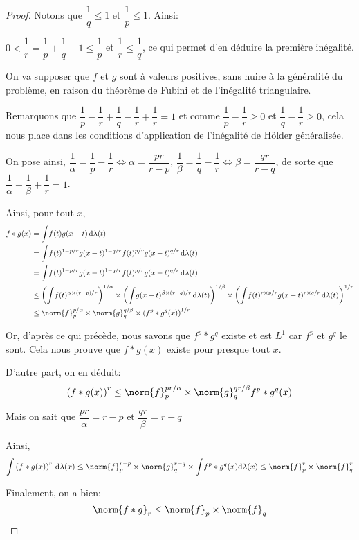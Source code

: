 \begin{proof}
Notons que $\dfrac{1}{q} \leq 1$ et $\dfrac{1}{p} \leq 1$. Ainsi:

$0 < \dfrac{1}{r} = \dfrac{1}{p}+\dfrac{1}{q}-1 \leq \dfrac{1}{p}$ et $\dfrac{1}{r} \leq \dfrac{1}{q}$, ce qui permet d'en déduire la première inégalité.

On va supposer que $f$ et $g$ sont à valeurs positives, sans nuire à la généralité du problème, en raison du théorème de Fubini et de l'inégalité triangulaire.

Remarquons que $\dfrac{1}{p}-\dfrac{1}{r}+\dfrac{1}{q}-\dfrac{1}{r}+\dfrac{1}{r} = 1$ et comme $\dfrac{1}{p}-\dfrac{1}{r} \geq 0$ et $\dfrac{1}{q}-\dfrac{1}{r} \geq 0$, cela nous place dans les conditions d'application de l'inégalité de Hölder généralisée.

On pose ainsi, $\dfrac{1}{\alpha} = \dfrac{1}{p}-\dfrac{1}{r} \iff \alpha = \dfrac{pr}{r-p}$, $\dfrac{1}{\beta} = \dfrac{1}{q}-\dfrac{1}{r} \iff \beta = \dfrac{qr}{r-q}$, de sorte que $\dfrac{1}{\alpha}+\dfrac{1}{\beta}+\dfrac{1}{r}=1$.

Ainsi, pour tout $x$,
\begin{align*}
f*g(x) & =\displaystyle{\int} f(t)g(x-t) \, \mathrm d \lambda(t) \\
 & = \displaystyle{\int} f(t)^{1-p/r}g(x-t)^{1-q/r}f(t)^{p/r}g(x-t)^{q/r} \, \mathrm d \lambda(t) \\
 & = \displaystyle{\int} f(t)^{1-p/r}g(x-t)^{1-q/r}f(t)^{p/r}g(x-t)^{q/r} \, \mathrm d \lambda(t) \\
 & \leq \left(\displaystyle{\int} f(t)^{\alpha \times (r-p)/r}\right)^{1/\alpha} \times \left(\displaystyle{\int} g(x-t)^{\beta\times (r-q)/r} \, \mathrm d \lambda(t)\right)^{1/\beta} \times \left(\displaystyle{\int} f(t)^{r \times p/r} g(x-t)^{r \times q/r} \, \mathrm d \lambda(t)\right)^{1/r} \\
  & \leq \norm{f}_p^{p/\alpha} \times \norm{g}_q^{q/\beta} \times   \left(f^p*g^q(x)\right)^{1/r}
 \end{align*}
 
Or, d'après ce qui précède, nous savons que $f^p*g^q$ existe et est $L^1$ car $f^p$ et $g^q$ le sont. Cela nous prouve que $f*g(x)$ existe pour presque tout $x$.

D'autre part, on en déduit:
\[
\left(f*g(x)\right)^r \leq \norm{f}_p^{pr/\alpha} \times \norm{g}_q^{qr/\beta} f^p*g^q(x)
\] 

Mais on sait que $\dfrac{pr}{\alpha} = r-p$ et $\dfrac{qr}{\beta} = r-q$ 

Ainsi,
\[
\displaystyle{\int} \left(f*g(x)\right)^r \, \mathrm d \lambda(x) \leq \norm{f}_p^{r-p} \times \norm{g}_q^{r-q} \times \displaystyle{\int} f^p*g^q(x) \mathrm d \lambda(x) \leq \norm{f}_p^r \times \norm{f}_q^r
\]

Finalement, on a bien:
\[
\norm{f*g}_r \leq \norm{f}_p \times \norm{f}_q
\]
\end{proof}


